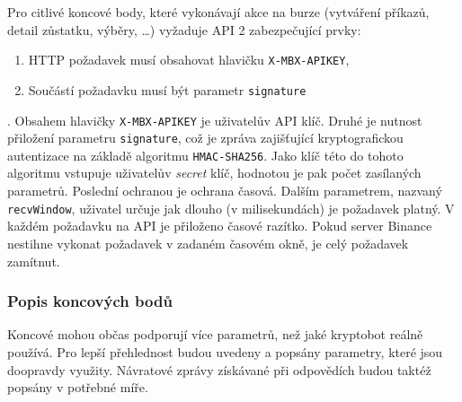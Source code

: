 Pro citlivé koncové body, které vykonávají akce na burze (vytváření příkazů, detail zůstatku, výběry, \ldots) vyžaduje API 2 zabezpečující prvky:
\begin{enumerate}
    \item HTTP požadavek musí obsahovat hlavičku \verb|X-MBX-APIKEY|,
    \item Součástí požadavku musí být parametr \verb|signature|
\end{enumerate} .
Obsahem hlavičky \verb|X-MBX-APIKEY| je uživatelův API klíč. Druhé je nutnost přiložení parametru \verb|signature|, což je zpráva zajišťující kryptografickou autentizace na základě 
algoritmu \verb|HMAC-SHA256|. Jako klíč této do tohoto algoritmu vstupuje uživatelův \emph{secret} klíč, hodnotou je pak počet zasílaných parametrů.
Poslední ochranou je ochrana časová. Dalším parametrem, nazvaný \verb|recvWindow|, uživatel určuje jak dlouho (v milisekundách) je požadavek platný. V každém požadavku na API je přiloženo
časové razítko. Pokud server Binance nestihne vykonat požadavek v zadaném časovém okně, je celý požadavek zamítnut.

\subsubsection{Popis koncových bodů}
Koncové mohou občas podporují více parametrů, než jaké kryptobot reálně používá. Pro lepší přehlednost budou uvedeny a popsány parametry, které jsou doopravdy využity. Návratové zprávy získávané
při odpovědích budou taktéž popsány v potřebné míře.

